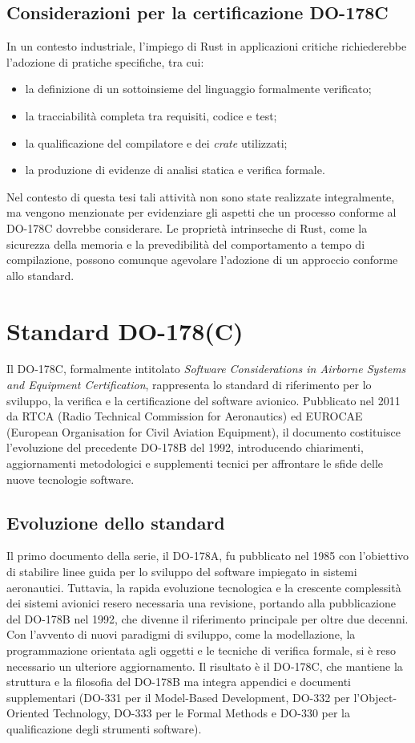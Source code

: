\documentclass[italian, Lau, oneside]{sapthesis} %
\begin{document}
\subsection{Considerazioni per la certificazione DO-178C}
In un contesto industriale, l’impiego di Rust in applicazioni critiche richiederebbe l’adozione di pratiche specifiche, tra cui:
\begin{itemize}
    \item la definizione di un sottoinsieme del linguaggio formalmente verificato;
    \item la tracciabilità completa tra requisiti, codice e test;
    \item la qualificazione del compilatore e dei \emph{crate} utilizzati;
    \item la produzione di evidenze di analisi statica e verifica formale.
\end{itemize}
Nel contesto di questa tesi tali attività non sono state realizzate integralmente, ma vengono menzionate per evidenziare gli aspetti che un processo conforme al DO-178C dovrebbe considerare.
Le proprietà intrinseche di Rust, come la sicurezza della memoria e la prevedibilità del comportamento a tempo di compilazione, possono comunque agevolare l’adozione di un approccio conforme allo standard.

\section{Standard DO-178(C)}

Il DO-178C, formalmente intitolato \emph{Software Considerations in Airborne Systems and Equipment Certification}, rappresenta lo standard di riferimento per lo sviluppo, la verifica e la certificazione del software avionico.  
Pubblicato nel 2011 da RTCA (Radio Technical Commission for Aeronautics) ed EUROCAE (European Organisation for Civil Aviation Equipment), il documento costituisce l’evoluzione del precedente DO-178B del 1992, introducendo chiarimenti, aggiornamenti metodologici e supplementi tecnici per affrontare le sfide delle nuove tecnologie software.

\subsection{Evoluzione dello standard}
Il primo documento della serie, il DO-178A, fu pubblicato nel 1985 con l’obiettivo di stabilire linee guida per lo sviluppo del software impiegato in sistemi aeronautici. Tuttavia, la rapida evoluzione tecnologica e la crescente complessità dei sistemi avionici resero necessaria una revisione, portando alla pubblicazione del DO-178B nel 1992, che divenne il riferimento principale per oltre due decenni.  
Con l’avvento di nuovi paradigmi di sviluppo, come la modellazione, la programmazione orientata agli oggetti e le tecniche di verifica formale, si è reso necessario un ulteriore aggiornamento. Il risultato è il DO-178C, che mantiene la struttura e la filosofia del DO-178B ma integra appendici e documenti supplementari (DO-331 per il Model-Based Development, DO-332 per l’Object-Oriented Technology, DO-333 per le Formal Methods e DO-330 per la qualificazione degli strumenti software).
\end{document}
